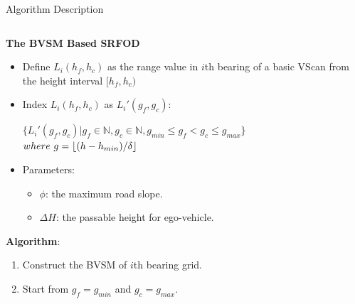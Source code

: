 \documentclass[final,hyperref={pdfpagelabels=false}]{beamer}
\DeclarePairedDelimiter{\floor}{\lfloor}{\rfloor}
\begin{document}
\begin{frame}[t]
\begin{columns}[t]
\begin{column}{.48\textwidth} %



\begin{block}{Algorithm Description}
\begin{columns}
	\begin{column}{0.49\textwidth}
		\begin{framed}
			\begin{center}
				\textbf{The BVSM Based SRFOD}
			\end{center}
			\begin{itemize}
				\item Define $L_i(h_f,h_c)$ as the range value in $i$th bearing of a basic VScan from the height interval $[h_f,h_c)$
				
				\item Index $L_i(h_f,h_c)$ as $L_i'(g_f,g_c)$:
				
				{\small\centering$\{L_i'(g_f,g_c) | g_f \in \mathbb{N}, g_c \in \mathbb{N}, g_{min} \leq g_f<g_c \leq g_{max}\}$}\\
				{\small$where~g=\floor{(h-h_{min})/\delta}$}
				
				\item Parameters:
				\begin{itemize}
					\item $\phi$: the maximum road slope.
					\item $\Delta H$: the passable height for ego-vehicle.
				\end{itemize}				
			\end{itemize}
			
			\textbf{Algorithm}:
			\begin{enumerate}
				\item Construct the BVSM of $i$th bearing grid.
				
				\item Start from $g_f=g_{min}$ and $g_c=g_{max}$.
				

\end{enumerate}
\end{framed}
\end{column}
\end{columns}
\end{block}
\end{column}
\end{columns}
\end{frame}
\end{document}

